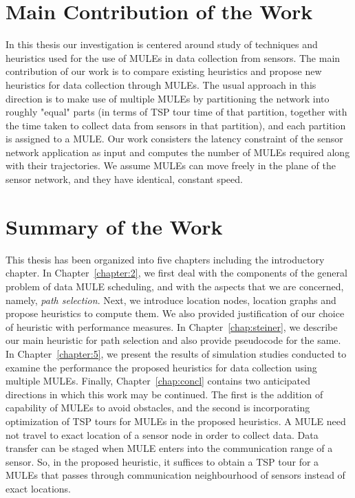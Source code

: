 \section{Main Contribution of the Work}
In this thesis our investigation is centered around study of techniques and heuristics used for the use of MULEs in data collection from sensors. The main contribution of our work is to compare existing heuristics and propose new heuristics for data collection through MULEs. The usual approach in this direction is to make use of multiple MULEs by partitioning the network into roughly "equal" parts (in terms of TSP tour time of that partition, together with the time taken to collect data from sensors in that partition), and each partition is assigned to a MULE. Our work consisters the latency constraint of the sensor network application as input and computes the number of MULEs required along with their trajectories. We assume MULEs can move freely in the plane of the sensor network, and they have identical, constant speed.

\section{Summary of the Work}
This thesis has been organized into five chapters including the 
introductory chapter. In Chapter~\ref{chapter:2}, we first deal with the components of the general problem of data MULE scheduling, and with the aspects that we are concerned, namely, {\em path selection}. Next, we introduce location nodes, location graphs and propose heuristics to compute them. We also provided justification of our choice of heuristic with performance measures. In Chapter~\ref{chap:steiner}, we describe our main heuristic for path selection and also provide pseudocode for the same. 
In Chapter~\ref{chapter:5}, we present the results of simulation studies conducted to examine the performance the proposed heuristics for data collection using multiple MULEs. Finally, 
Chapter~\ref{chap:concl} contains two anticipated directions in which this work may be continued. 
The first is the addition of capability of MULEs to avoid obstacles, and the second is incorporating optimization of TSP tours for MULEs in the proposed heuristics. A MULE need not travel to exact location of a sensor node in order to collect data. Data transfer can be staged when MULE enters into the communication range of a sensor. So, in the proposed heuristic, it suffices to obtain a TSP tour for a MULEs that passes through communication neighbourhood of sensors instead of exact locations. %
